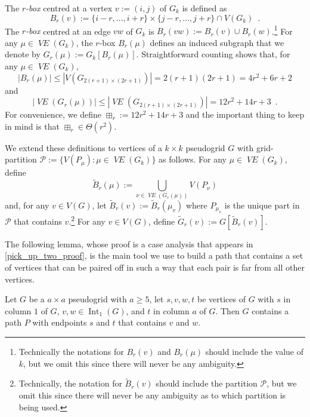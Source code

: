 \documentclass{patmorin}
\newcommand{\vol}[1]{\boxplus_{#1}}
\DeclareMathOperator{\interior}{Int}
\newcommand{\defin}[1]{\emph{\color{brightmaroon}#1}}
\DeclareMathOperator{\VE}{\mathit{VE}}
\begin{document}
The \defin{$r$-box} centred at a vertex $v:=(i,j)$ of $G_{k}$ is defined as
\[
  B_r(v) := \{i-r,\ldots,i+r\}\times\{j-r,\ldots,j+r\} \cap V(G_{k}) \enspace .
\]
The \defin{$r$-box} centred at an edge $vw$ of $G_{k}$ is $B_r(vw):=B_r(v)\cup B_r(w)$.\footnote{Technically the notations for $B_r(v)$ and $B_r(\mu)$ should include the value of $k$, but we omit this since there will never be any ambiguity.}
For any $\mu\in\VE(G_k)$, the $r$-box $B_r(\mu)$ defines an induced subgraph that we denote by $G_r(\mu):=G_{k}[B_r(\mu)]$.  Straightforward counting shows that, for any $\mu\in\VE(G_k)$,
\[
   |B_r(\mu)| \le |V(G_{2(r+1)\times (2r+1)})| = 2(r+1)(2r+1) = 4r^2+6r+2
\]
and
\begin{equation}
   |\VE(G_r(\mu))| \le |\VE(G_{2(r+1)\times (2r+1)})| = 12r^2+14r+3 \enspace . \label{rbox_size}
\end{equation}
For convenience, we define $\vol{r}:=12r^2+14r+3$ and the important thing to  keep in mind is that $\vol{r} \in\Theta(r^2)$.
%

We extend these definitions to vertices of a $k\times k$ pseudogrid $G$ with grid-partition $\mathcal{P}:=\{V(P_\mu):\mu\in\VE(G_k)\}$ as follows. For any $\mu\in\VE(G_k)$, define
\[
   \tilde{B}_r(\mu) := \bigcup_{\nu\in \VE(G_r(\mu))} V(P_\nu)
\]
and, for any $v\in V(G)$, let $\tilde{B}_r(v):=\tilde{B}_r(\mu_v)$ where $P_{\mu_v}$ is the unique part in $\mathcal{P}$ that contains $v$.\footnote{Technically, the notation for $\tilde{B}_r(v)$ should include the partition $\mathcal{P}$, but we omit this since there will never be any ambiguity as to which partition is being used.}
For any $v\in V(G)$, define $\tilde{G}_r(v):=G[\tilde{B}_r(v)]$.

The following lemma, whose proof is a case analysis that appears in \cref{pick_up_two_proof}, is the main tool we use to build a path that contains a set of vertices that can be paired off in such a way that each pair is far from all other vertices.

\begin{lem}\label{pick_up_two}
  Let $G$ be a $a\times a$ pseudogrid with $a\ge 5$,  let $s,v,w,t$ be vertices of $G$ with $s$ in column $1$ of $G$, $v,w\in \interior_1(G)$, and $t$ in column $a$ of $G$.  Then $G$ contains a path $P$ with endpoints $s$ and $t$ that contains $v$ and $w$.
\end{lem}
\end{document}
